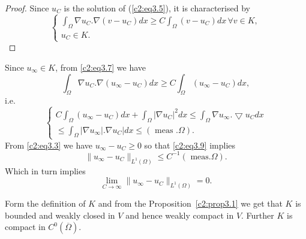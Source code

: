 \begin{proof}
Since $u_C$  is the solution of (\ref{c2:eq3.5}), it is characterised by 
\begin{equation}
\begin{cases}
\int_\Omega \nabla u_C . \nabla (v - u_C) dx \geq
C \int_\Omega (v - u_C) dx\, \forall  v \in K,\\ 
u_C \in K.\tag{3.7}\label{c2:eq3.7}
\end{cases}
\end{equation}
\end{proof}
Since $u_\infty \in K$, from \eqref{c2:eq3.7} we have 
\begin{equation}
\int_\Omega \nabla u_C. \nabla (u_\infty - u_C) dx
\geq C \int_\Omega (u_\infty - u_C )dx, \tag{3.8}\label{c2:eq3.8} 
\end{equation}
i.e.
\begin{equation}
\begin{cases}
C \int_\Omega (u_\infty - u_C) dx + \int_\Omega | \nabla u_C
| ^2 dx \leq \int_\Omega \nabla u_\infty. \bigtriangledown
u_C dx \\ 
\leq \int_\Omega | \nabla u_\infty | . \nabla u_C
| dx \leq (\text{ meas }. \Omega ). 
\end{cases}\tag{3.9}\label{c2:eq3.9} 
\end{equation} 
From \eqref{c2:eq3.3} we have $u_\infty - u_C \geq 0$ 
so that \eqref{c2:eq3.9} implies
$$
\parallel  u_\infty - u_C \parallel  _{L^1 (\Omega)} \leq C^{-1} 
(\text{ meas}. \Omega). 
$$  
Which in turn implies 
\begin{equation}
\lim_{C \to \infty } \parallel  u_\infty - u_C \parallel  _{L^1 (\Omega)} =
0. \tag{3.10}\label{c2:eq3.10} 
\end{equation}

Form the definition of $K$ and from the Proposition~\ref{c2:prop3.1} we get that
$K$ is bounded and weakly closed in $V$ and hence weakly compact  in
$V$. Further $K$ is compact in $C^0 (\overline{\Omega})$.  

